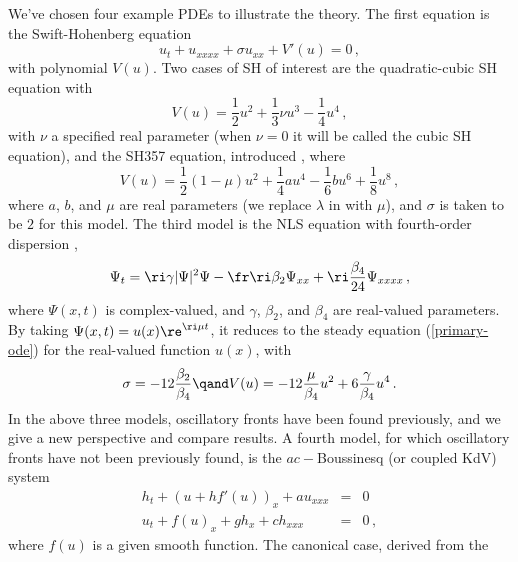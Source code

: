 \documentclass[10pt]{article}
\begin{document}
We've chosen four example PDEs to illustrate the theory.  The first equation is
the Swift-Hohenberg equation
%
\begin{equation}\label{SH-unsteady}
u_t + u_{xxxx} + \sigma u_{xx} + V'(u)=0\,,
\end{equation}
%
with polynomial $V(u)$. Two cases of SH of interest are the quadratic-cubic SH equation with
%
\begin{equation}\label{SH-cubic-V}
V(u) = \frac{1}{2} u^2 +\frac{1}{3}\nu u^3 - \frac{1}{4} u^4\,,
\end{equation}
%
with $\nu$ a specified real parameter (when $\nu=0$ it will be called the cubic SH equation),
and the SH357 equation, introduced \cite{kuw19}, where
%
\begin{equation}\label{SH357-V}
V(u) = \frac{1}{2}(1-\mu) u^2 + \frac{1}{4} a u^4 - \frac{1}{6}b u^6 + \frac{1}{8} u^8\,,
\end{equation}
%
where $a$, $b$, and $\mu$ are real parameters (we replace $\lambda$ in \cite{kuw19} with $\mu$), and $\sigma$ is taken to be $2$ for this model.
The third model is the NLS equation with
fourth-order dispersion \cite{bgbk21,bgbk23,bgbk25},
%
\begin{equation}\label{nls-4}
  \Psi_t = \ri\gamma |\Psi|^2\Psi - \fr \ri \beta_2 \Psi_{xx} + \ri\frac{\beta_4}{24} \Psi_{xxxx}\,,
\end{equation}
%
where $\Psi(x,t)$ is complex-valued, and $\gamma$, $\beta_2$, and $\beta_4$ are
real-valued parameters.  By taking $\Psi(x,t) = u(x)\re^{\ri\mu t}$, it reduces to
the steady equation (\ref{primary-ode}) for the real-valued function $u(x)$,
with
%
\begin{equation}\label{nls-steady-V}
  \sigma = -12\frac{\beta_2}{\beta_4} \qand
  V(u) = -12 \frac{\mu}{\beta_4}u^2  + 6 \frac{\gamma}{\beta_4}u^4\,.
\end{equation}
%
In the above three models, oscillatory fronts have been found previously, and we
give a new perspective and compare results. A fourth model, for which
oscillatory fronts have not been previously found, is the $ac-$Boussinesq (or coupled KdV) system
%
\begin{equation}\label{ac-B}
\begin{array}{rcl}
h_t + (u + hf'(u))_x +a u_{xxx} &=&0\\[2mm]
u_t + f(u)_x + gh_x + c h_{xxx} &=& 0\,,
\end{array}
\end{equation}
%
where $f(u)$ is a given smooth function.  The canonical case, derived from the
\end{document}
